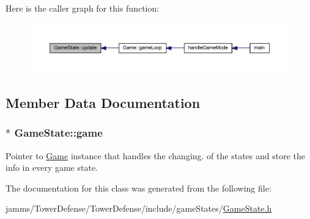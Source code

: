 Here is the caller graph for this function\+:\nopagebreak
\begin{figure}[H]
\begin{center}
\leavevmode
\includegraphics[width=350pt]{class_game_state_ad331d02d3989271b8cbc88fcb1448959_icgraph}
\end{center}
\end{figure}




\subsection{Member Data Documentation}
\hypertarget{class_game_state_a355a79415b9ef63c2aec1448a99f6e71}{
\subsubsection[{game}]{$\ast$ Game\+State\+::game}}\label{class_game_state_a355a79415b9ef63c2aec1448a99f6e71}


Pointer to \hyperlink{class_game}{Game} instance that handles the changing. of the states and store the info in every game state. 



The documentation for this class was generated from the following file\+:\begin{DoxyCompactItemize}
\item 
jamms/\+Tower\+Defense/\+Tower\+Defense/include/game\+States/\hyperlink{_game_state_8h}{Game\+State.\+h}\end{DoxyCompactItemize}
